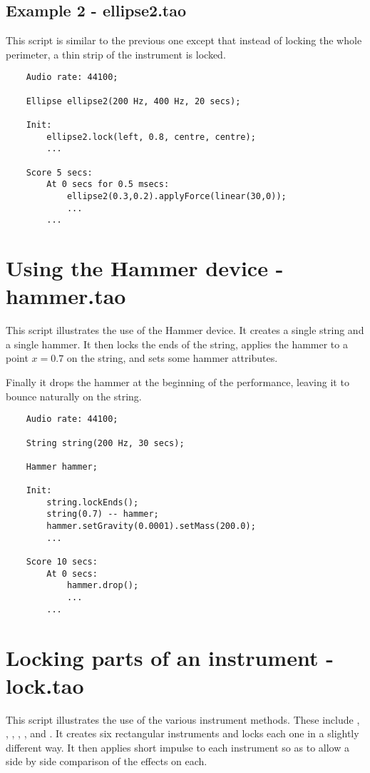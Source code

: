 \subsection{Example 2 - ellipse2.tao}
This script is similar to the previous one except that instead of
locking the whole perimeter, a thin strip of the instrument is locked.

\begin{verbatim}
    Audio rate: 44100;
        
    Ellipse ellipse2(200 Hz, 400 Hz, 20 secs);
        
    Init:
        ellipse2.lock(left, 0.8, centre, centre);
        ...
        
    Score 5 secs:
        At 0 secs for 0.5 msecs:
            ellipse2(0.3,0.2).applyForce(linear(30,0));
            ...
        ...
\end{verbatim}
 
\section{Using the Hammer device - hammer.tao}
This script illustrates the use of the Hammer device. It creates
a single string and a single hammer. It then locks the ends of the string,
applies the hammer to a point $x=0.7$ on the string, and sets some
hammer attributes.

Finally it drops the hammer at the beginning of the performance, leaving
it to bounce naturally on the string.

\begin{verbatim}
    Audio rate: 44100;
        
    String string(200 Hz, 30 secs);
        
    Hammer hammer;
        
    Init:
        string.lockEnds();
        string(0.7) -- hammer;
        hammer.setGravity(0.0001).setMass(200.0);
        ...
        
    Score 10 secs:
        At 0 secs:
            hammer.drop();
            ...
        ...
\end{verbatim}
 
\section{Locking parts of an instrument - lock.tao}
This script illustrates the use of the various 
instrument methods. These include ,
, , ,
, and . It creates six
rectangular instruments and locks each one in a slightly different
way. It then applies short impulse to each instrument so as to allow
a side by side comparison of the effects on each.

